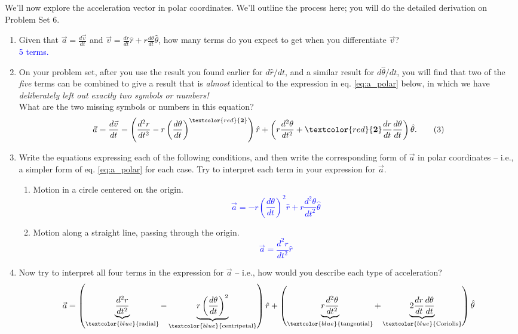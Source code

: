 \documentclass[11pt, letterpaper, openany]{book}
\newenvironment{exercise}[1][Exercise]{%
  \tcolorbox[blanker, breakable, left=1em,
    before skip=1em, after skip=1em,
    borderline west={3pt}{0pt}{PhysNavy},
    colback=PhysCream,
    before upper={\textcolor{PhysNavy}{\sffamily\bfseries #1:}\space}
  ]%
}{%
  \endtcolorbox%
}
\begin{document}
\begin{exercise}[Exercise 4]
We'll now explore the acceleration vector in polar coordinates. We'll outline the process here; you will do the detailed derivation on Problem Set 6.
\begin{enumerate}[label=(\alph*)]
    \item Given that $\vec{a} = \frac{d\vec{v}}{dt}$ and $\vec{v} = \frac{dr}{dt}\hat{r} + r\frac{d\theta}{dt}\hat{\theta}$, how many terms do you expect to get when you differentiate $\vec{v}$? \\
    \textcolor{blue}{5 terms.}
    \item On your problem set, after you use the result you found earlier for $d\hat{r}/dt$, and a similar result for $d\hat{\theta}/dt$, you will find that two of the \textit{five} terms can be combined to give a result that is \textit{almost} identical to the expression in eq. \ref{eq:a_polar} below, in which we have \textit{deliberately left out exactly two symbols or numbers!} \\
    What are the two missing symbols or numbers in this equation?
    \[ \vec{a} = \frac{d\vec{v}}{dt} = \left(\frac{d^2 r}{dt^2} - r\left(\frac{d\theta}{dt}\right)^{\textcolor{red}{\mathbf{2}}}\right)\hat{r} + \left(r\frac{d^2\theta}{dt^2} + \textcolor{red}{\mathbf{2}}\frac{dr}{dt}\frac{d\theta}{dt}\right)\hat{\theta}. \label{eq:a_polar} \tag{3} \]
    \item Write the equations expressing each of the following conditions, and then write the corresponding form of $\vec{a}$ in polar coordinates -- i.e., a simpler form of eq. \ref{eq:a_polar} for each case. Try to interpret each term in your expression for $\vec{a}$.
    \begin{enumerate}[label=(\roman*)]
        \item Motion in a circle centered on the origin. \\
        \textcolor{blue}{
        \[ \vec{a} = -r\left(\frac{d\theta}{dt}\right)^2\hat{r} + r\frac{d^2\theta}{dt^2}\hat{\theta} \]
        }
        \item Motion along a straight line, passing through the origin. \\
        \textcolor{blue}{
        \[ \vec{a} = \frac{d^2r}{dt^2}\hat{r} \]
        }
    \end{enumerate}
    \item Now try to interpret all four terms in the expression for $\vec{a}$ -- i.e., how would you describe each type of acceleration?
    \[ \vec{a} = \left( \underbrace{\frac{d^2 r}{dt^2}}_{\textcolor{blue}{\text{radial}}} - \underbrace{r\left(\frac{d\theta}{dt}\right)^2}_{\textcolor{blue}{\text{centripetal}}} \right)\hat{r} + \left( \underbrace{r\frac{d^2\theta}{dt^2}}_{\textcolor{blue}{\text{tangential}}} + \underbrace{2\frac{dr}{dt}\frac{d\theta}{dt}}_{\textcolor{blue}{\text{Coriolis}}} \right)\hat{\theta} \]

\end{enumerate}
\end{exercise}
\end{document}
